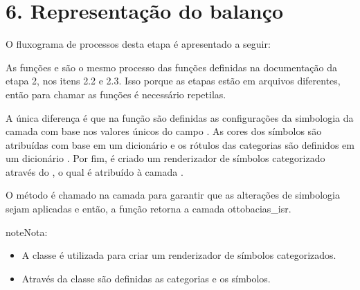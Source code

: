 \documentclass[a4paper,10pt,brazil]{sphinxmanual}
\begin{document}
\sphinxstepscope


\section{6. Representação do balanço}
\label{\detokenize{6representacaoBalanco:representacao-do-balanco}}\label{\detokenize{6representacaoBalanco::doc}}
\sphinxAtStartPar
O fluxograma de processos desta etapa é apresentado a seguir:


\sphinxAtStartPar
As funções  e  são o mesmo processo das funções definidas na documentação da etapa 2, nos itens 2.2 e 2.3. Isso porque as etapas estão em arquivos diferentes, então para chamar as funções é necessário repeti\sphinxhyphen{}las.

\sphinxAtStartPar
A única diferença é que na função  são definidas as configurações da simbologia da camada  com base nos valores únicos do campo . As cores dos símbolos são atribuídas com base em um dicionário  e os rótulos das categorias são definidos em um dicionário . Por fim, é criado um renderizador de símbolos categorizado através do , o qual é atribuído à camada .

\sphinxAtStartPar
O método  é chamado na camada para garantir que as alterações de simbologia sejam aplicadas e então, a função retorna a camada ottobacias\_isr.

\begin{sphinxadmonition}{note}{Nota:}\begin{itemize}
\item {} 
\sphinxAtStartPar
A classe  é utilizada para criar um renderizador de símbolos categorizados.

\item {} 
\sphinxAtStartPar
Através da classe  são definidas as categorias e os símbolos.

\end{itemize}
\end{sphinxadmonition}
\end{document}
